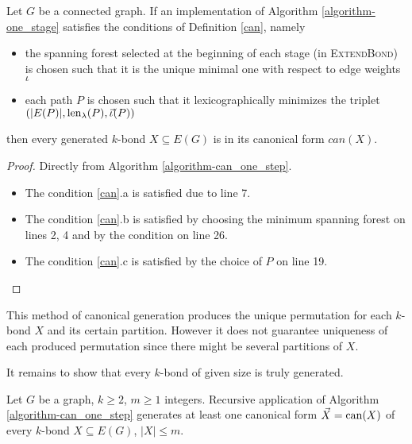 \begin{lem}
	\label{lem:alg_is_canonical}
	Let $G$ be a connected graph. If an implementation of Algorithm \ref{algorithm-one_stage} satisfies the conditions of Definition \ref{can}, namely

	\begin{itemize}
		\item the spanning forest selected at the beginning of each stage (in \textsc{ExtendBond}) is chosen such that it is the unique minimal one with respect to edge weights $\iota$
		\item each path $P$ is chosen such that it lexicographically minimizes the triplet $(\lvert E(P) \rvert, \operatorname{len}_\lambda(P), \vec{\iota}(P) )$
	\end{itemize}

	then every generated $k$-bond $X \subseteq E(G)$ is in its canonical form $can(X)$.
\end{lem}

\begin{proof}
	Directly from Algorithm \ref{algorithm-can_one_step}.
	\begin{itemize}
		\item The condition \ref{can}.a is satisfied due to line 7.
		\item The condition \ref{can}.b is satisfied by choosing the minimum spanning forest on lines 2, 4 and by the condition on line 26.
		\item The condition \ref{can}.c is satisfied by the choice of $P$ on line 19.
	\end{itemize}
\end{proof}

\begin{rem}
	This method of canonical generation produces the unique permutation for each $k$-bond $X$ and its certain partition. However it does not guarantee uniqueness of each produced permutation since there might be several partitions of $X$.
\end{rem}

\bigskip

\noindent It remains to show that every $k$-bond of given size is truly generated.

\begin{thm}
	Let $G$ be a graph, $k \geq 2$, $m \geq 1$ integers. Recursive application of Algorithm \ref{algorithm-can_one_step} generates at least one canonical form $\vec X = \operatorname{can}(X)$ of every $k$-bond $X \subseteq E(G)$, $\lvert X \rvert \leq m$.
\end{thm}

